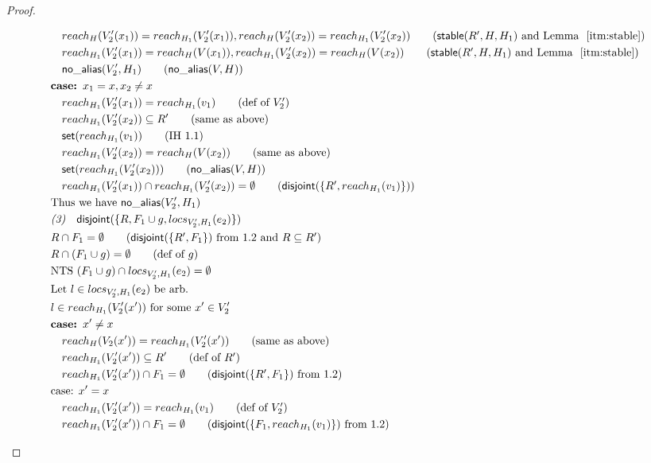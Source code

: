 \documentclass[11pt]{article}
\newcommand{\ms}[1]{\ensuremath{\mathsf{#1}}}
\newcommand{\na}[1]{\mathsf{no\_alias}(#1)}
\newcommand{\stable}[1]{\mathsf{stable}(#1)}
\newcommand{\dist}[1]{\mathsf{disjoint}(#1)}
\theoremstyle{definition}
\begin{document}
\begin{proof}
\begin{description}
\begin{align*}
  &\quad reach_H(V_2'(x_1)) = reach_{H_1}(V_2'(x_1)),reach_H(V_2'(x_2)) = reach_{H_1}(V_2'(x_2)) \tag{$\stable{R',H,H_1}$ and Lemma $~\ref{itm:stable}$}\\
  &\quad reach_{H_1}(V_2'(x_1)) = reach_{H}(V(x_1)),reach_{H_1}(V_2'(x_2)) = reach_{H}(V(x_2)) \tag{$\stable{R',H,H_1}$ and Lemma $~\ref{itm:stable}$}\\
  &\quad \na{V_2',H_1} \tag{$\na{V,H}$}\\
  &\textbf{case: } x_1 = x, x_2 \ne x\\
  &\quad reach_{H_1}(V_2'(x_1)) = reach_{H_1}(v_1) \tag{def of $V_2'$}\\
  &\quad reach_{H_1}(V_2'(x_2)) \subseteq R' \tag{same as above}\\
  &\quad \ms{set}(reach_{H_1}(v_1)) \tag{IH 1.1}\\
  &\quad reach_{H_1}(V_2'(x_2)) = reach_{H}(V(x_2)) \tag{same as above}\\
  &\quad \ms{set}(reach_{H_1}(V_2'(x_2))) \tag{$\na{V,H}$}\\
  &\quad reach_{H_1}(V_2'(x_1)) \cap reach_{H_1}(V_2'(x_2)) = \emptyset \tag{$\dist{\{R',reach_{H_1}(v_1)\}}$}\\
  &\text{Thus we have } \na{V_2',H_1}\\
  &\emph{(3)}\quad \dist{\{R,F_1 \cup g,locs_{V_2',H_1}(e_2)\}}\\
  &R \cap F_1 = \emptyset \tag{$\dist{\{R', F_1\}}$ from 1.2 and $R \subseteq R'$}\\
  &R \cap (F_1 \cup g) = \emptyset \tag{def of $g$}\\
  &\text{NTS } (F_1 \cup g) \cap locs_{V_2',H_1}(e_2) = \emptyset\\
  &\text{Let } l \in locs_{V_2',H_1}(e_2) \text{ be arb.}\\
  &l \in reach_{H_1}(V_2'(x')) \text{ for some } x' \in V_2'\\
  &\textbf{case: } x' \ne x\\
  &\quad reach_H(V_2(x')) = reach_{H_1}(V_2'(x')) \tag{same as above}\\
  &\quad reach_{H_1}(V_2'(x')) \subseteq R' \tag{def of $R'$}\\
  &\quad reach_{H_1}(V_2'(x')) \cap F_1 = \emptyset \tag{$\dist{\{R', F_1\}}$ from 1.2}\\
  &\text{case: } x' = x\\
  &\quad reach_{H_1}(V_2'(x')) = reach_{H_1}(v_1) \tag{def of $V_2'$}\\
  &\quad reach_{H_1}(V_2'(x')) \cap F_1 = \emptyset \tag{$\dist{\{F_1,reach_{H_1}(v_1)\}}$ from 1.2}\\

\end{align*}
\end{description}
\end{proof}
\end{document}
